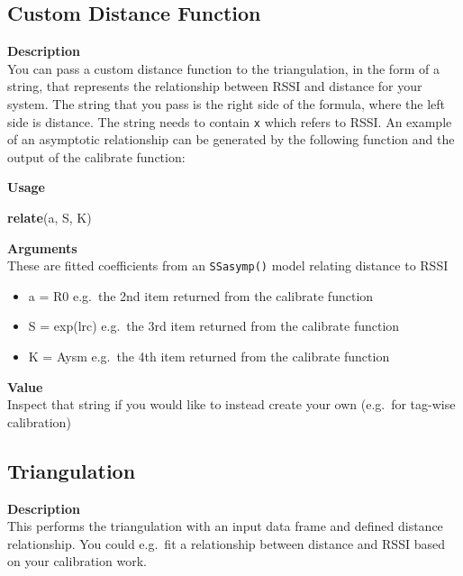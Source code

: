 \documentclass[
]{book}
\newenvironment{Shaded}{\begin{snugshade}}{\end{snugshade}}
\newcommand{\KeywordTok}[1]{\textcolor[rgb]{0.13,0.29,0.53}{\textbf{#1}}}
\newcommand{\NormalTok}[1]{#1}
\providecommand{\tightlist}{%
  \setlength{\itemsep}{0pt}\setlength{\parskip}{0pt}}
\begin{document}
\hypertarget{custom-distance-function}{%
\subsection{Custom Distance Function}\label{custom-distance-function}}

\textbf{Description}\\
You can pass a custom distance function to the triangulation, in the form of a string, that represents the relationship between RSSI and distance for your system. The string that you pass is the right side of the formula, where the left side is distance. The string needs to contain \texttt{x} which refers to RSSI. An example of an asymptotic relationship can be generated by the following function and the output of the calibrate function:

\textbf{Usage}

\begin{Shaded}
\begin{Highlighting}[]
\KeywordTok{relate}\NormalTok{(a, S, K)}
\end{Highlighting}
\end{Shaded}

\textbf{Arguments}\\
These are fitted coefficients from an \texttt{SSasymp()} model relating distance to RSSI

\begin{itemize}
\tightlist
\item
  a = R0 e.g.~the 2nd item returned from the calibrate function\\
\item
  S = exp(lrc) e.g.~the 3rd item returned from the calibrate function\\
\item
  K = Aysm e.g.~the 4th item returned from the calibrate function
\end{itemize}

\textbf{Value}\\
Inspect that string if you would like to instead create your own (e.g.~for tag-wise calibration)

\hypertarget{triangulation}{%
\subsection{Triangulation}\label{triangulation}}

\textbf{Description}\\
This performs the triangulation with an input data frame and defined distance relationship. You could e.g.~fit a relationship between distance and RSSI based on your calibration work.
\end{document}

